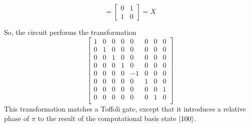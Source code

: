 $$= \begin{bmatrix} 0 & 1 \\ 1 & 0\end{bmatrix} = X$$


So, the circuit performs the transformation $$\begin{bmatrix}
1 & 0 & 0 & 0 & 0 & 0 & 0 & 0 \\
0 & 1 & 0 & 0 & 0 & 0 & 0 & 0 \\
0 & 0 & 1 & 0 & 0 & 0 & 0 & 0 \\
0 & 0 & 0 & 1 & 0 & 0 & 0 & 0 \\
0 & 0 & 0 & 0 & -1 & 0 & 0 & 0 \\
0 & 0 & 0 & 0 & 0 & 1 & 0 & 0 \\
0 & 0 & 0 & 0 & 0 & 0 & 0 & 1 \\
0 & 0 & 0 & 0 & 0 & 0 & 1 & 0 \\
\end{bmatrix}$$
This transformation matches a Toffoli gate, except that it introduces a relative phase of $\pi$ to the result of the computational basis state $\ket{100}$.

